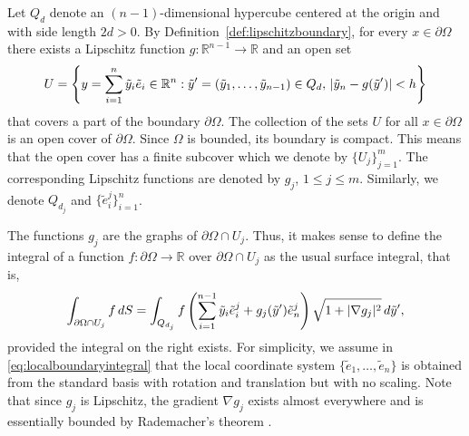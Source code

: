\documentclass[english, 12pt, a4paper, sci, utf8, a-2b, online]{aaltothesis}
\theoremstyle{definition}
\theoremstyle{plain}
\DeclarePairedDelimiter\abs{\lvert}{\rvert}
\newcommand*\diff{\mathop{}\!d}
\numberwithin{equation}{section}
\begin{document}
Let $Q_d$ denote an $(n-1)$-dimensional hypercube centered at the origin
and with side length $2d > 0$. By Definition~\ref{def:lipschitzboundary},
for every $x \in \partial \Omega$ there exists a Lipschitz function
$g: \mathbb{R}^{n-1} \to \mathbb{R}$ and an open set
\begin{equation*}
    U = \left\{ y = \sum_{i=1}^{n} \tilde{y}_i \tilde{e}_i \in \mathbb{R}^n :
        \tilde{y}' = (\tilde{y}_1,\dotsc,\tilde{y}_{n-1}) \in Q_d, \,
        \abs{\tilde{y}_n - g(\tilde{y}')} < h
    \right\}
\end{equation*}
that covers a part of the boundary $\partial \Omega$.
The collection of the sets $U$ for all $x \in \partial \Omega$ is
an open cover of $\partial \Omega$. Since $\Omega$ is bounded, its boundary
is compact. This means that the open cover has a finite subcover which
we denote by $\{ U_j \}_{j=1}^{m}$. The corresponding Lipschitz functions
are denoted by $g_j$, $1 \leq j \leq m$. Similarly, we denote
$Q_{d_j}$ and $\{ \tilde{e}_i^j \}_{i=1}^{n}$.

The functions $g_j$ are the graphs of $\partial \Omega \cap U_j$.
Thus, it makes sense to define the integral of a function
$f: \partial \Omega \to \mathbb{R}$ over $\partial \Omega \cap U_j$
as the usual surface integral, that is,
\begin{equation}
    \label{eq:localboundaryintegral}
    \int_{\partial \Omega \cap U_j} f \diff S
    = \int_{Q_{d_j}} f\left( \sum_{i=1}^{n-1} \tilde{y}_i \tilde{e}_i^j + 
        g_j(\tilde{y}') \tilde{e}_n^j \right)
            \sqrt{1 + \abs{\nabla g_j}^2} \diff \tilde{y}',
\end{equation}
provided the integral on the right exists.
For simplicity, we assume in \eqref{eq:localboundaryintegral}
that the local coordinate system $\{ \tilde{e}_1,\dotsc,\tilde{e}_n \}$
is obtained from the standard basis
with rotation and translation but with no scaling.
Note that since $g_j$ is Lipschitz,
the gradient $\nabla g_j$ exists almost everywhere and is essentially bounded
by Rademacher's theorem \cite{schwab1998}.
\end{document}
